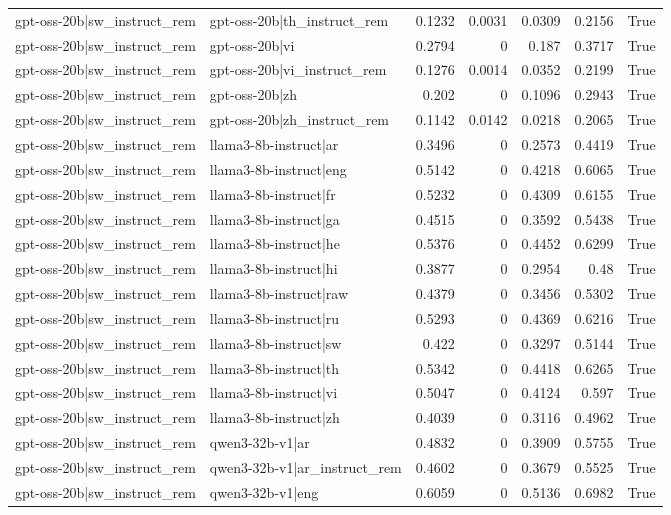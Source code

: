 \begin{table}
\begin{tabular}{l l r r r r l}
gpt-oss-20b|sw_instruct_rem & gpt-oss-20b|th_instruct_rem & 0.1232 & 0.0031 & 0.0309 & 0.2156 & True \\
gpt-oss-20b|sw_instruct_rem & gpt-oss-20b|vi & 0.2794 & 0 & 0.187 & 0.3717 & True \\
gpt-oss-20b|sw_instruct_rem & gpt-oss-20b|vi_instruct_rem & 0.1276 & 0.0014 & 0.0352 & 0.2199 & True \\
gpt-oss-20b|sw_instruct_rem & gpt-oss-20b|zh & 0.202 & 0 & 0.1096 & 0.2943 & True \\
gpt-oss-20b|sw_instruct_rem & gpt-oss-20b|zh_instruct_rem & 0.1142 & 0.0142 & 0.0218 & 0.2065 & True \\
gpt-oss-20b|sw_instruct_rem & llama3-8b-instruct|ar & 0.3496 & 0 & 0.2573 & 0.4419 & True \\
gpt-oss-20b|sw_instruct_rem & llama3-8b-instruct|eng & 0.5142 & 0 & 0.4218 & 0.6065 & True \\
gpt-oss-20b|sw_instruct_rem & llama3-8b-instruct|fr & 0.5232 & 0 & 0.4309 & 0.6155 & True \\
gpt-oss-20b|sw_instruct_rem & llama3-8b-instruct|ga & 0.4515 & 0 & 0.3592 & 0.5438 & True \\
gpt-oss-20b|sw_instruct_rem & llama3-8b-instruct|he & 0.5376 & 0 & 0.4452 & 0.6299 & True \\
gpt-oss-20b|sw_instruct_rem & llama3-8b-instruct|hi & 0.3877 & 0 & 0.2954 & 0.48 & True \\
gpt-oss-20b|sw_instruct_rem & llama3-8b-instruct|raw & 0.4379 & 0 & 0.3456 & 0.5302 & True \\
gpt-oss-20b|sw_instruct_rem & llama3-8b-instruct|ru & 0.5293 & 0 & 0.4369 & 0.6216 & True \\
gpt-oss-20b|sw_instruct_rem & llama3-8b-instruct|sw & 0.422 & 0 & 0.3297 & 0.5144 & True \\
gpt-oss-20b|sw_instruct_rem & llama3-8b-instruct|th & 0.5342 & 0 & 0.4418 & 0.6265 & True \\
gpt-oss-20b|sw_instruct_rem & llama3-8b-instruct|vi & 0.5047 & 0 & 0.4124 & 0.597 & True \\
gpt-oss-20b|sw_instruct_rem & llama3-8b-instruct|zh & 0.4039 & 0 & 0.3116 & 0.4962 & True \\
gpt-oss-20b|sw_instruct_rem & qwen3-32b-v1|ar & 0.4832 & 0 & 0.3909 & 0.5755 & True \\
gpt-oss-20b|sw_instruct_rem & qwen3-32b-v1|ar_instruct_rem & 0.4602 & 0 & 0.3679 & 0.5525 & True \\
gpt-oss-20b|sw_instruct_rem & qwen3-32b-v1|eng & 0.6059 & 0 & 0.5136 & 0.6982 & True \\

\end{tabular}
\end{table}
